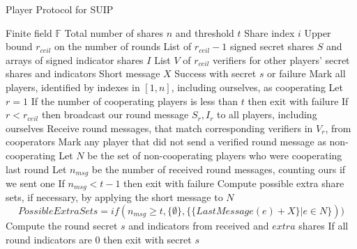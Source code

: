 \documentclass{dalcsthesis}
\begin{document}
\begin{algorithm}
  \caption{Player Protocol for SUIP}
  \label{alg:SUIP:Player}
  \begin{algorithmic}[1]
    \INPUT Finite field $\mathbb{F}$
    \INPUT Total number of shares $n$ and threshold $t$
    \INPUT Share index $i$
    \INPUT Upper bound $r_{ceil}$ on the number of rounds
    \INPUT List of $r_{ceil}-1$ signed secret shares $S$ and arrays of signed indicator shares $I$
    \INPUT List $V$ of $r_{ceil}$ verifiers for other players' secret shares and indicators
    \INPUT Short message $X$
    \OUTPUT Success with secret $s$ or failure
    \STATE Mark all players, identified by indexes in $[1, n]$, including ourselves, as cooperating
    \STATE Let $r = 1$
      \STATE If the number of cooperating players is less than $t$ then exit with failure
      \STATE If $r < r_{ceil}$ then broadcast our round message $S_r, I_r$ to all players, including ourselves
      \STATE Receive round messages, that match corresponding verifiers in $V_r$, from cooperators
      \STATE Mark any player that did not send a verified round message as non-cooperating
      \STATE Let $N$ be the set of non-cooperating players who were cooperating last round
      \STATE Let $n_{msg}$ be the number of received round messages, counting ours if we sent one
      \STATE If $n_{msg} < t - 1$ then exit with failure
      \STATE Compute possible extra share sets, if necessary, by applying the short message to $N$
      		$$PossibleExtraSets = if(n_{msg} \geq t, \{\emptyset\}, \{\{LastMessage(e) + X\} | e \in N\}))$$
        \STATE Compute the round secret $s$ and indicators from received and $extra$ shares
        \STATE If all round indicators are 0 then exit with secret $s$
      \ENDFOR
    \ENDWHILE
  \end{algorithmic}
\end{algorithm}
\end{document}
